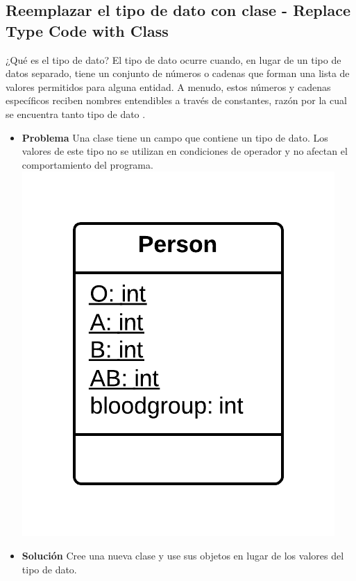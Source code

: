 \documentclass[11pt,a4paper,oneside]{book}
\begin{document}
\subsection{Reemplazar el tipo de dato con clase -  Replace Type Code with Class}
¿Qué es el tipo de dato? El tipo de dato ocurre cuando, en lugar de un tipo de datos separado, tiene un conjunto de números o cadenas que forman una lista de valores permitidos para alguna entidad. A menudo, estos números y cadenas específicos reciben nombres entendibles a través de constantes, razón por la cual se encuentra tanto tipo de dato .
\label{replacetypecodewithclass}
\begin{itemize}
    \item \textbf{Problema} Una clase tiene un campo que contiene un tipo de dato. Los valores de este tipo no se utilizan en condiciones de operador y no afectan el comportamiento del programa.\\
    \centering \includegraphics[scale=0.2]{replacetypecodewithclassproblem}
    \item \textbf{Solución} Cree una nueva clase y use sus objetos en lugar de los valores del tipo de dato.\\

\end{itemize}
\end{document}
